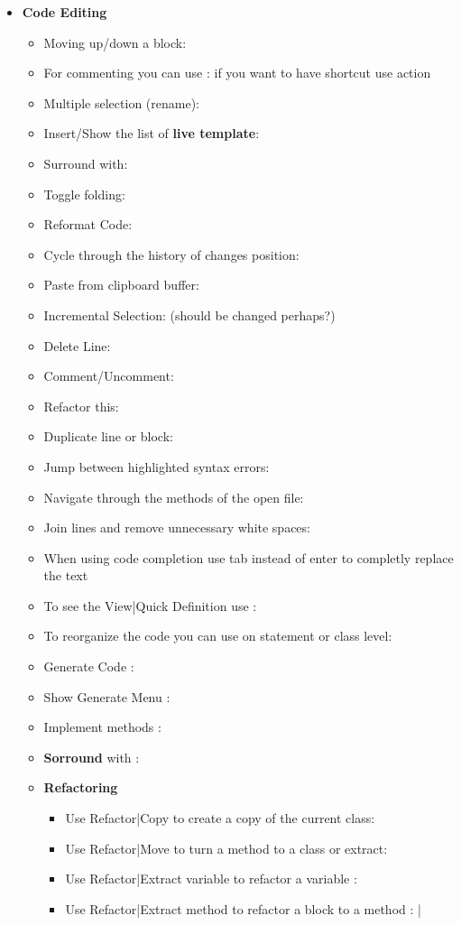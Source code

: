 \begin{itemize}
	\item \textbf{Code Editing}
	\begin{itemize}
		\item Moving up/down a block: 
		\item For commenting you can use \ic{/**}: if you want to have shortcut use  action
		\item Multiple selection (rename): 
		\item Insert/Show the list of \textbf{live template}: 
		\item Surround with: 
		\item Toggle folding: 
		\item Reformat Code: 
		\item Cycle through the history of changes position: 
		\item Paste from clipboard buffer: 
		\item Incremental Selection:  (should be changed perhaps?)
		\item Delete Line: 
		\item Comment/Uncomment: 
		\item Refactor this: 
		\item Duplicate line or block: 
		\item Jump between highlighted syntax errors: 
		\item Navigate through the methods of the open file: 
		\item Join lines and remove unnecessary white spaces: 
		\item When using code completion use tab instead of enter to completly replace the text
		\item To see the View|Quick Definition use : 
		\item To reorganize the code you can use on statement or class level: 
		\item Generate Code : 
		\item Show Generate Menu : 
		\item Implement methods : 
		\item \textbf{Sorround} with : 
		\item \textbf{Refactoring}
		\begin{itemize}
			\item Use Refactor|Copy to create a copy of the current class: 
			\item Use Refactor|Move to turn a method to a class or extract: 
			\item Use Refactor|Extract variable to refactor a variable : 
			\item Use Refactor|Extract method to refactor a block to a method : | 
		\end{itemize}
	\end{itemize}


\end{itemize}
